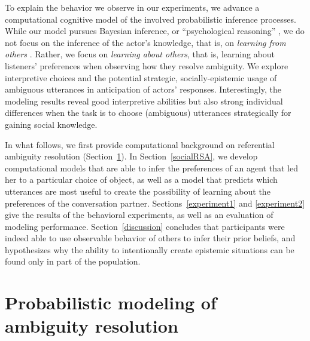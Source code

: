 \documentclass[11pt,a4paper]{article}
\begin{document}
To explain the behavior we observe in our experiments, we advance a computational cognitive model of the involved probabilistic inference processes. 
While our model pursues Bayesian inference, or ``psychological reasoning'' \cite{frankgoodman2012}, we do not focus on the inference of the actor's knowledge, that is, on \emph{learning from others} \cite{shafto2012learning}.
Rather, we focus on \emph{learning about others}, that is, learning about listeners' preferences when observing how they resolve ambiguity. 
We explore interpretive choices and the potential strategic, socially-epistemic usage of ambiguous utterances in anticipation of actors' responses. 
Interestingly, the modeling results reveal good interpretive abilities but also strong individual differences when the task is to choose (ambiguous) utterances strategically for gaining social knowledge. 

In what follows, we first provide computational background on referential ambiguity resolution (Section~\ref{modelingTheory}).
In Section~\ref{socialRSA}, we develop computational models that are able to infer the preferences of an agent that led her to a particular choice of object, as well as a model that predicts which utterances are most useful to create the possibility of learning about the preferences of the conversation partner. 
Sections~\ref{experiment1} and \ref{experiment2} give the results of the behavioral experiments, as well as an evaluation of modeling performance. 
Section~\ref{discussion} concludes that participants were indeed able to use observable behavior of others to infer their prior beliefs, and hypothesizes why the ability to intentionally create epistemic situations can be found only in part of the population.





\section{Probabilistic modeling of ambiguity resolution} \label{modelingTheory}
\end{document}
